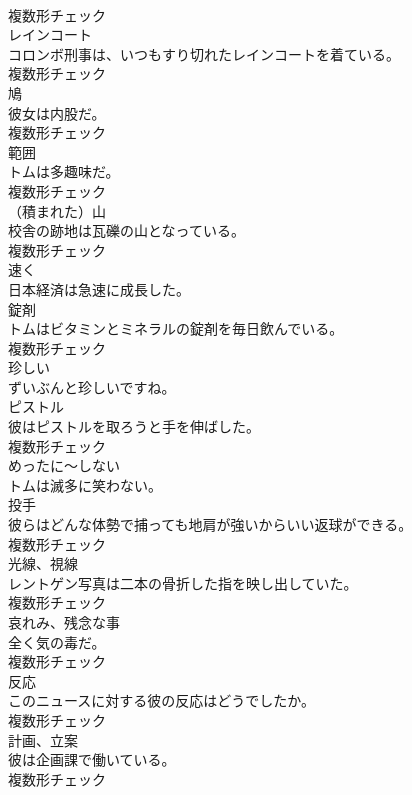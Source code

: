 \documentclass[8pt]{extreport}
\begin{document}
\begin{CJK}{UTF8}{min}
\\	複数形チェック
\\	[名詞]	レインコート	
\\	コロンボ刑事は、いつもすり切れたレインコートを着ている。	
\\	複数形チェック
\\	[名詞]	鳩	
\\	彼女は内股だ。	
\\	複数形チェック
\\	[名詞]	範囲	
\\	トムは多趣味だ。	
\\	複数形チェック
\\	[名詞]	（積まれた）山	
\\	校舎の跡地は瓦礫の山となっている。	
\\	複数形チェック
\\	[副詞]	速く	
\\	日本経済は急速に成長した。	
\\	[名詞]	錠剤	
\\	トムはビタミンとミネラルの錠剤を毎日飲んでいる。	
\\	複数形チェック
\\	[形容詞]	珍しい	
\\	ずいぶんと珍しいですね。	
\\	[名詞]	ピストル	
\\	彼はピストルを取ろうと手を伸ばした。	
\\	複数形チェック
\\	[副詞]	めったに〜しない	
\\	トムは滅多に笑わない。	
\\	[名詞]	投手	
\\	彼らはどんな体勢で捕っても地肩が強いからいい返球ができる。	
\\	複数形チェック
\\	[名詞]	光線、視線	
\\	レントゲン写真は二本の骨折した指を映し出していた。	
\\	複数形チェック
\\	[名詞]	哀れみ、残念な事	
\\	全く気の毒だ。	
\\	複数形チェック
\\	[名詞]	反応	
\\	このニュースに対する彼の反応はどうでしたか。	
\\	複数形チェック
\\	[名詞]	計画、立案	
\\	彼は企画課で働いている。	
\\	複数形チェック

\end{CJK}
\end{document}
